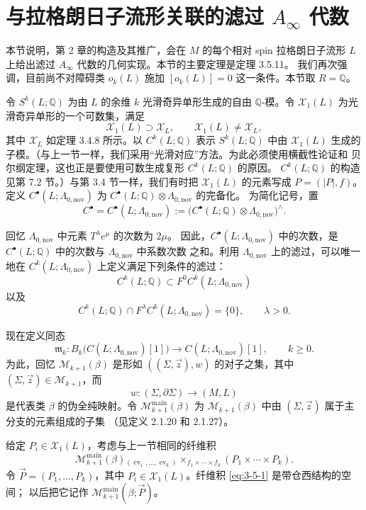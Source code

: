 
\section{与拉格朗日子流形关联的滤过 $A_\infty$ 代数}
\label{sec:3-5}

本节说明，第 2 章的构造及其推广，会在 $M$ 的每个相对 spin 拉格朗日子流形
$L$ 上给出滤过 $A_\infty$ 代数的几何实现。本节的主要定理是定理 3.5.11。
我们再次强调，目前尚不对障碍类 $o_k(L)$ 施加
$[o_k(L)]=0$ 这一条件。本节取 $R=\mathbb Q$。

令 $S^k(L;\mathbb Q)$ 为由 $L$ 的余维 $k$ 光滑奇异单形生成的自由
$\mathbb Q$-模。令 $\mathcal X_1(L)$ 为光滑奇异单形的一个可数集，满足
\[
  \mathcal X_1(L)\supset\mathcal X_L,\qquad
  \mathcal X_1(L)\ne\mathcal X_L,
\]
其中 $\mathcal X_L$ 如定理 3.4.8 所示。以
$C^k(L;\mathbb Q)$ 表示 $S^k(L;\mathbb Q)$ 中由 $\mathcal X_1(L)$
生成的子模。（与上一节一样，我们采用“光滑对应”方法。为此必须使用横截性论证和
贝尔纲定理，这也正是要使用可数生成复形 $C^k(L;\mathbb Q)$ 的原因。
$C^k(L;\mathbb Q)$ 的构造见第 7.2 节。）与第 3.4 节一样，我们有时把
$\mathcal X_1(L)$ 的元素写成 $P=(|P|,f)$。定义
$C^\bullet(L;\Lambda_{0,\mathrm{nov}})$ 为
$C^\bullet(L;\mathbb Q)\otimes\Lambda_{0,\mathrm{nov}}$ 的完备化。
为简化记号，置
\[
  C^\bullet=C^\bullet(L;\Lambda_{0,\mathrm{nov}})
  :=\bigl(C^\bullet(L;\mathbb Q)
  \otimes\Lambda_{0,\mathrm{nov}}\bigr)^{\wedge}.
\]

回忆 $\Lambda_{0,\mathrm{nov}}$ 中元素 $T^\lambda e^\mu$ 的次数为 $2\mu$。
因此，$C^\bullet(L;\Lambda_{0,\mathrm{nov}})$ 中的次数，是
$C^\bullet(L;\mathbb Q)$ 中的次数与 $\Lambda_{0,\mathrm{nov}}$ 中系数次数
之和。利用 $\Lambda_{0,\mathrm{nov}}$ 上的滤过，可以唯一地在
$C^k(L;\Lambda_{0,\mathrm{nov}})$ 上定义满足下列条件的滤过：
\[
  C^k(L;\mathbb Q)\subset F^0C^k(L;\Lambda_{0,\mathrm{nov}})
\]
以及
\[
  C^k(L;\mathbb Q)\cap F^\lambda
  C^k(L;\Lambda_{0,\mathrm{nov}})=\{0\},
  \qquad \lambda>0.
\]

现在定义同态
\[
  \mathfrak m_k\colon
  B_k\bigl(C(L;\Lambda_{0,\mathrm{nov}})[1]\bigr)
  \longrightarrow C(L;\Lambda_{0,\mathrm{nov}})[1],
  \qquad k\geq0.
\]
为此，回忆 $\mathcal M_{k+1}(\beta)$ 是形如
$((\Sigma,\vec z),w)$ 的对子之集，其中
$(\Sigma,\vec z)\in\mathcal M_{k+1}$，而
\[
  w\colon(\Sigma,\partial\Sigma)\longrightarrow(M,L)
\]
是代表类 $\beta$ 的伪全纯映射。令
$\mathcal M_{k+1}^{\mathrm{main}}(\beta)$ 为
$\mathcal M_{k+1}(\beta)$ 中由 $(\Sigma,\vec z)$ 属于主分支的元素组成的子集
（见定义 2.1.20 和 2.1.27）。

给定 $P_i\in\mathcal X_1(L)$，考虑与上一节相同的纤维积
\begin{equation}
  \mathcal M_{k+1}^{\mathrm{main}}(\beta)
  {}_{(\operatorname{ev}_1,\ldots,\operatorname{ev}_k)}
  \!\times_{f_1\times\cdots\times f_k}
  (P_1\times\cdots\times P_k).
  \tag{3.5.1}\label{eq:3-5-1}
\end{equation}
令 $\vec P=(P_1,\ldots,P_k)$，其中
$P_i\in\mathcal X_1(L)$。纤维积 \eqref{eq:3-5-1} 是带仓西结构的空间；
以后把它记作
$\mathcal M_{k+1}^{\mathrm{main}}(\beta;\vec P)$。

